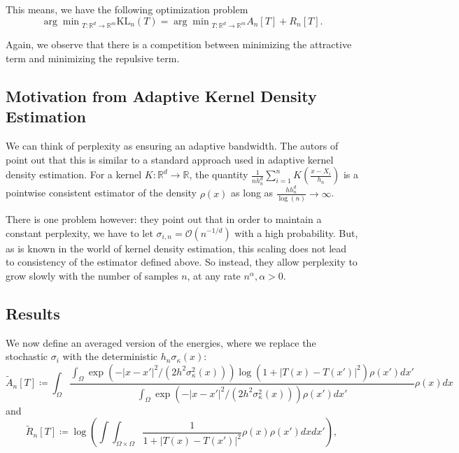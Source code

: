 This means, we have the following optimization problem
\begin{equation}
    {\arg \min}_{T: \mathbb{R}^d \to \mathbb{R}^m} \text{KL}_n (T) = {\arg \min}_{T: \mathbb{R}^d \to \mathbb{R}^m} A_n[T] + R_n[T].
\end{equation}

Again, we observe that there is a competition between minimizing the attractive term and minimizing the repulsive term. 

\subsection*{Motivation from Adaptive Kernel Density Estimation}

We can think of perplexity as ensuring an adaptive bandwidth. 
The autors of \cite{murray2024largedatalimitsscaling} point out that this is similar to a standard approach used in adaptive kernel density estimation. 
For a kernel $K: \mathbb{R}^d \to \mathbb{R}$, the quantity $\frac{1}{n h_n^d}\sum_{i=1}^n K(\frac{x-X_i}{h_n})$ is a pointwise consistent estimator of the density $\rho(x)$ as long as $\frac{h h_n^d}{\log(n)} \to \infty$. 

There is one problem however: they point out that in order to maintain a constant perplexity, we have to let $\sigma_{i,n} = \mathcal{O}(n^{-1/d})$ with a high probability. 
But, as is known in the world of kernel density estimation, this scaling does not lead to consistency of the estimator defined above. 
So instead, they allow perplexity to grow slowly with the number of samples $n$, at any rate $n^\alpha, \alpha > 0$. 

\subsection*{Results}

We now define an averaged version of the energies, where we replace the stochastic $\sigma_i$ with the deterministic $h_n \sigma_\kappa(x)$: 
\begin{equation}
    \tilde{A}_n[T] \coloneq  \int_{\Omega} \frac{\int_{\Omega} \exp(-|x - x'|^2/(2 h^2 \sigma_\kappa^2(x))) \log(1+ |T(x) - T(x')|^2) \rho(x')dx'}{\int_{\Omega} \exp(-|x - x'|^2/(2 h^2 \sigma_\kappa^2(x))) \rho(x')dx'} \rho(x)dx  
\end{equation}
and 
\begin{equation}
    \tilde{R}_n[T] \coloneq \log \left( \int \int_{\Omega \times \Omega} \frac{1}{1+ |T(x) - T(x')|^2} \rho(x) \rho(x')dx dx' \right), 
\end{equation}

